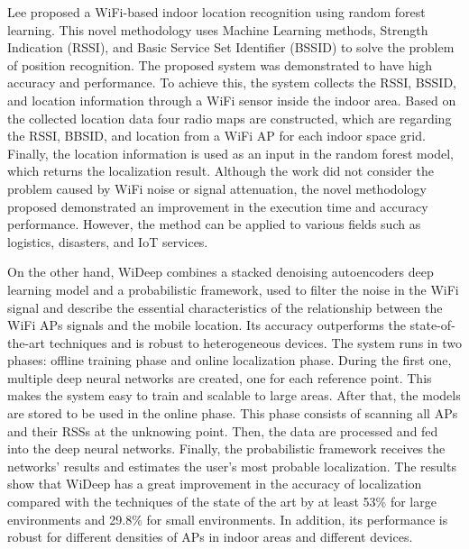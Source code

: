    Lee \cite{Lee2019} proposed a WiFi-based indoor location recognition using random forest learning. This novel methodology uses Machine Learning methods, Strength Indication (RSSI), and Basic Service Set Identifier (BSSID) to solve the problem of position recognition. The proposed system was demonstrated to have high accuracy and performance.
    To achieve this, the system collects the RSSI, BSSID, and location information through a WiFi sensor inside the indoor area. Based on the collected location data four radio maps are constructed, which
    are regarding the RSSI, BBSID, and location from a WiFi AP for each indoor space grid. Finally, the location information is used as an input in the random forest model, which returns the localization result.
    Although the work did not consider the problem caused by WiFi noise or signal attenuation, the novel methodology proposed demonstrated an improvement in the execution time and accuracy performance. However, the method can be applied to various fields such as logistics, disasters, and IoT services.
    
    On the other hand, WiDeep \cite{Abbas2019} combines a stacked denoising autoencoders deep learning model and a probabilistic framework, used to filter the noise in the WiFi signal and describe the essential characteristics of the relationship between the WiFi APs signals and the mobile location. Its accuracy outperforms the state-of-the-art techniques and is robust to heterogeneous devices.
    The system runs in two phases: offline training phase and online localization phase. During the first one, multiple deep neural networks are created, one for each reference point. This makes the system easy to train and scalable to large areas. After that, the models are stored to be used in the online phase. This phase consists of scanning all APs and their RSSs at the unknowing point. Then, the data are processed and fed into the deep neural networks. Finally, the probabilistic framework receives the networks' results and estimates the user's most probable localization.
    The results show that WiDeep has a great improvement in the accuracy of localization compared with the techniques of the state of the art by at least 53\% for large environments and 29.8\% for small environments. In addition, its performance is robust for different densities of APs in indoor areas and different devices.
    
